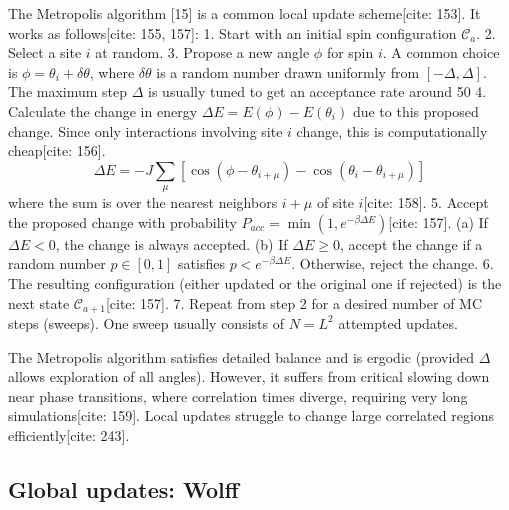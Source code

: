 \documentclass[11pt]{article}
\begin{document}
The Metropolis algorithm [15] is a common local update scheme[cite: 153]. It works as follows[cite: 155, 157]:
1.  Start with an initial spin configuration $\mathcal{C}_a$.
2.  Select a site $i$ at random.
3.  Propose a new angle $\phi$ for spin $i$. A common choice is $\phi = \theta_i + \delta\theta$, where $\delta\theta$ is a random number drawn uniformly from $[-\Delta, \Delta]$. The maximum step $\Delta$ is usually tuned to get an acceptance rate around 50%
4.  Calculate the change in energy $\Delta E = E(\phi) - E(\theta_i)$ due to this proposed change. Since only interactions involving site $i$ change, this is computationally cheap[cite: 156].
    \begin{equation}
    \Delta E = -J \sum_{\mu} [\cos(\phi - \theta_{i+\mu}) - \cos(\theta_i - \theta_{i+\mu})] \label{eq:metropolis_deltaE}
    \end{equation}
    where the sum is over the nearest neighbors $i+\mu$ of site $i$[cite: 158].
5.  Accept the proposed change with probability $P_{acc} = \min(1, e^{-\beta \Delta E})$[cite: 157].
    (a) If $\Delta E < 0$, the change is always accepted.
    (b) If $\Delta E \ge 0$, accept the change if a random number $p \in [0, 1]$ satisfies $p < e^{-\beta \Delta E}$. Otherwise, reject the change.
6.  The resulting configuration (either updated or the original one if rejected) is the next state $\mathcal{C}_{a+1}$[cite: 157].
7.  Repeat from step 2 for a desired number of MC steps (sweeps). One sweep usually consists of $N=L^2$ attempted updates.

The Metropolis algorithm satisfies detailed balance and is ergodic (provided $\Delta$ allows exploration of all angles). However, it suffers from critical slowing down near phase transitions, where correlation times diverge, requiring very long simulations[cite: 159]. Local updates struggle to change large correlated regions efficiently[cite: 243].

\subsection{Global updates: Wolff}
\end{document}
